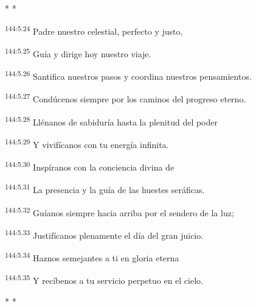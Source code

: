 \begin{center}
	\par * * *
\end{center}

\begin{center}
\par 
\textsuperscript{144:5.24} Padre nuestro celestial, perfecto y justo,

\par 
\textsuperscript{144:5.25} Guía y dirige hoy nuestro viaje.

\par 
\textsuperscript{144:5.26} Santifica nuestros pasos y coordina nuestros pensamientos.

\par 
\textsuperscript{144:5.27} Condúcenos siempre por los caminos del progreso eterno.

\par 
\textsuperscript{144:5.28} Llénanos de sabiduría hasta la plenitud del poder

\par 
\textsuperscript{144:5.29} Y vivifícanos con tu energía infinita.

\par 
\textsuperscript{144:5.30} Inspíranos con la conciencia divina de

\par 
\textsuperscript{144:5.31} La presencia y la guía de las huestes seráficas.

\par 
\textsuperscript{144:5.32} Guíanos siempre hacia arriba por el sendero de la luz;

\par 
\textsuperscript{144:5.33} Justifícanos plenamente el día del gran juicio.

\par 
\textsuperscript{144:5.34} Haznos semejantes a ti en gloria eterna

\par 
\textsuperscript{144:5.35} Y recíbenos a tu servicio perpetuo en el cielo.
\end{center}

\begin{center}
	\par * * *
\end{center}

